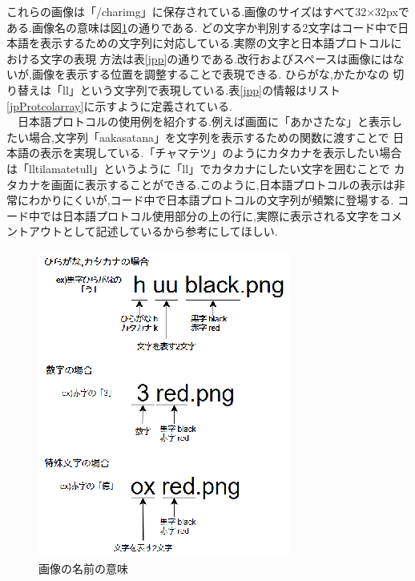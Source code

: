 \documentclass[a4j]{jarticle}
\begin{document}
これらの画像は「/charimg」に保存されている.画像のサイズはすべて32$\times$32pxである.画像名の意味は図\ref{howname}の通りである.
どの文字か判別する2文字はコード中で日本語を表示するための文字列に対応している.実際の文字と日本語プロトコルにおける文字の表現
方法は表\ref{jpp}の通りである.改行およびスペースは画像にはないが,画像を表示する位置を調整することで表現できる. ひらがな,かたかなの
切り替えは「ll」という文字列で表現している.表\ref{jpp}の情報はリスト\ref{jpProtcolarray}に示すように定義されている.\\
　日本語プロトコルの使用例を紹介する.例えば画面に「あかさたな」と表示したい場合,文字列「aakasatana」を文字列を表示するための関数に渡すことで
日本語の表示を実現している.「チャマテツ」のようにカタカナを表示したい場合は「lltilamatetull」というように「ll」でカタカナにしたい文字を囲むことで
カタカナを画面に表示することができる.このように,日本語プロトコルの表示は非常にわかりにくいが,コード中で日本語プロトコルの文字列が頻繁に登場する.
コード中では日本語プロトコル使用部分の上の行に,実際に表示される文字をコメントアウトとして記述しているから参考にしてほしい.

\begin{figure}[H]
  \centering
  \includegraphics[scale=1.7]{howname.eps}
  \caption{画像の名前の意味}
   \label{howname}
  \end{figure}    
\end{document}
